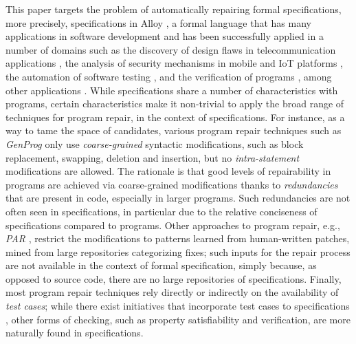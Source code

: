 This paper targets the problem of automatically repairing formal specifications, more precisely, specifications in Alloy \cite{Jackson2006}, a formal language that has many applications in software development and has been successfully applied in a number of domains such as the discovery of design flaws in telecommunication applications \cite{Zave2017}, the analysis of security mechanisms in mobile and IoT platforms \cite{Bagheri+2018,DBLP:conf/issta/AlhanahnahSB20,DBLP:conf/dsn/BagheriSBM16}, the automation of software testing \cite{Khalek+2011,DBLP:conf/icse/MirzaeiGBSM16,Abad+2013}, and the verification of programs \cite{Dennis+2006,Galeotti+2010,Galeotti+2013}, among other applications \cite{Jackson2019}. While specifications share a number of characteristics with programs, certain characteristics make it non-trivial to apply the broad range of techniques for program repair, in the context of specifications. For instance, as a way to tame the space of candidates, various program repair techniques such as \emph{GenProg} \cite{LeGoues+2012} only use \emph{coarse-grained} syntactic modifications, such as block replacement, swapping, deletion and insertion, but no \emph{intra-statement} modifications are allowed. The rationale is that good levels of repairability in programs are achieved via coarse-grained modifications thanks to \emph{redundancies} that are present in code, especially in larger programs. Such redundancies are not often seen in specifications, in particular due to the relative conciseness of specifications compared to programs. Other approaches to program repair, e.g., \emph{PAR} \cite{Kim+2013}, restrict the modifications to patterns learned from human-written patches, mined from large repositories categorizing fixes; such inputs for the repair process are not available in the context of formal specification, simply because, as opposed to source code, there are no large repositories of specifications. Finally, most program repair techniques rely directly or indirectly on the availability of \emph{test cases}; while there exist initiatives that incorporate test cases to specifications \cite{Sullivan+2018}, other forms of checking, such as property satisfiability and verification, are more naturally found in specifications. 


